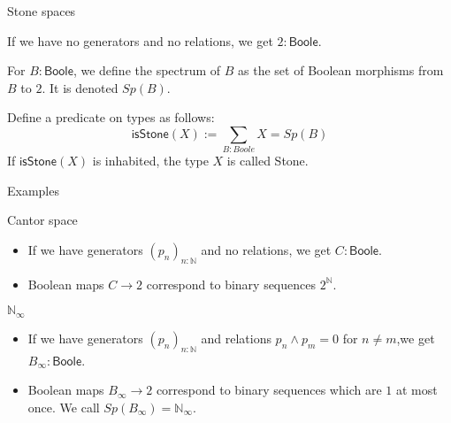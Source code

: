 \documentclass{beamer}
\newcommand{\Boole}{\mathsf{Boole}}
\newcommand{\isSt}{\mathsf{isStone}}
\begin{document}
\begin{frame}{Stone spaces}
  \begin{example}
    If we have no generators and no relations, we get $2:\Boole$.
  \end{example}
  \pause
\begin{definition}
  For $B:\Boole$, we define the spectrum of $B$ as 
  the set of Boolean morphisms from $B$ to $2$. 
  It is denoted $Sp(B)$.
\end{definition}
\pause
\begin{definition}
  Define a predicate on types as follows:
  \pause
  \begin{equation*}
    \isSt(X) := \sum\limits_{B : Boole} X = Sp(B)
  \end{equation*} 
  \pause 
  If $\isSt(X)$ is inhabited, the type $X$ is called Stone.
\end{definition}
\end{frame}

\begin{frame}{Examples}
  \begin{exampleblock}{Cantor space}
    \begin{itemize}
      \item 
        If we have generators $(p_n)_{n:\mathbb N}$ 
        and no relations, we get $C : \Boole$.
    \pause
  \item 
    Boolean maps $C \to 2$ correspond to \pause binary sequences $2^\mathbb N$.
    \end{itemize}
  \end{exampleblock}
  \pause
  \begin{exampleblock}{$\mathbb N_\infty$}
    \begin{itemize}
      \item 
    If we have generators $(p_n)_{n:\mathbb N}$ \pause 
    and relations $p_n \wedge p_m = 0$ for 
    $n \neq m$,\pause  we get $B_\infty:\Boole$. 
    \item 
    \pause
    Boolean maps $B_\infty \to 2$ correspond to \pause 
    binary sequences \pause which are $1$ at most once.
    \pause
    We call $Sp(B_\infty) = \mathbb N_\infty$. 
    \end{itemize}
  \end{exampleblock}
\end{frame}
\end{document}
